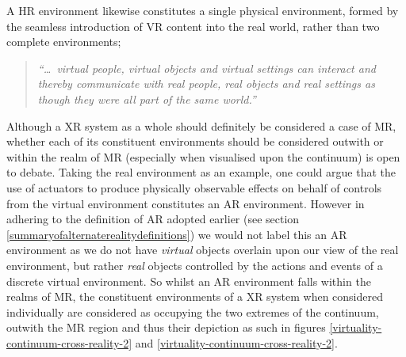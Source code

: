 A HR environment likewise constitutes a single physical environment, formed by the seamless introduction of VR content into the real world, rather than two complete environments;


\begin{quote}
	\textit{``\ldots\ virtual people, virtual objects and virtual settings can interact and thereby communicate with real people, real objects and real settings as though they were all part of the same world.''}~\cite{Terashima2001}
\end{quote}

Although a XR system as a whole should definitely be considered a case of MR, whether each of its constituent environments should be considered outwith or within the realm of MR (especially when visualised upon the continuum) is open to debate. Taking the real environment as an example, one could argue that the use of actuators to produce physically observable effects on behalf of controls from the virtual environment constitutes an AR environment. However in adhering to the definition of AR adopted earlier (see section \ref{summaryofalternaterealitydefinitions}) we would not label this an AR environment as we do not have \textit{virtual} objects overlain upon our view of the real environment, but rather \textit{real} objects controlled by the actions and events of a discrete virtual environment. So whilst an AR environment falls within the realms of MR, the constituent environments of a XR system when considered individually are considered as occupying the two extremes of the continuum, outwith the MR region and thus their depiction as such in figures \ref{virtuality-continuum-cross-reality-2} and \ref{virtuality-continuum-cross-reality-2}.



